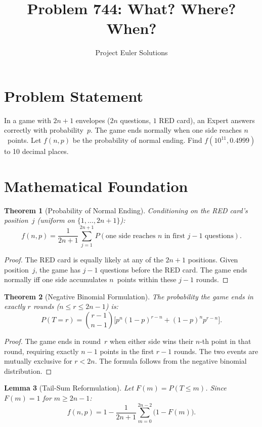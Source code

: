 \documentclass[11pt]{article}
\title{Problem 744: What? Where? When?}
\author{Project Euler Solutions}
\date{}
\newtheorem{theorem}{Theorem}
\newtheorem{lemma}[theorem]{Lemma}
\theoremstyle{definition}
\begin{document}
\maketitle

\section{Problem Statement}

In a game with $2n+1$ envelopes ($2n$ questions, $1$ RED card), an Expert answers correctly with probability~$p$. The game ends normally when one side reaches $n$~points. Let $f(n,p)$ be the probability of normal ending. Find $f(10^{11}, 0.4999)$ to 10 decimal places.

\section{Mathematical Foundation}

\begin{theorem}[Probability of Normal Ending]
Conditioning on the RED card's position~$j$ (uniform on $\{1,\ldots,2n+1\}$):
\[
f(n,p) = \frac{1}{2n+1}\sum_{j=1}^{2n+1} P(\text{one side reaches } n \text{ in first } j-1 \text{ questions}).
\]
\end{theorem}

\begin{proof}
The RED card is equally likely at any of the $2n+1$ positions. Given position~$j$, the game has $j-1$ questions before the RED card. The game ends normally iff one side accumulates $n$~points within these $j-1$ rounds.
\end{proof}

\begin{theorem}[Negative Binomial Formulation]
The probability the game ends in exactly $r$ rounds ($n \le r \le 2n-1$) is:
\[
P(T = r) = \binom{r-1}{n-1}\bigl[p^n(1-p)^{r-n} + (1-p)^n p^{r-n}\bigr].
\]
\end{theorem}

\begin{proof}
The game ends in round~$r$ when either side wins their $n$-th point in that round, requiring exactly $n-1$ points in the first $r-1$ rounds. The two events are mutually exclusive for $r < 2n$. The formula follows from the negative binomial distribution.
\end{proof}

\begin{lemma}[Tail-Sum Reformulation]
Let $F(m) = P(T \le m)$. Since $F(m) = 1$ for $m \ge 2n-1$:
\[
f(n,p) = 1 - \frac{1}{2n+1}\sum_{m=0}^{2n-2}\bigl(1 - F(m)\bigr).
\]
\end{lemma}
\end{document}
